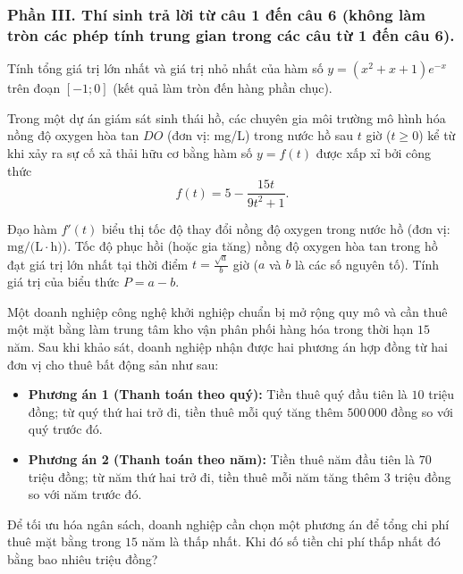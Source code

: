 \subsubsection*{Phần III. Thí sinh trả lời từ câu 1 đến câu 6 (không làm tròn các phép tính trung gian trong các câu từ 1 đến câu 6).}
\setcounter{bt}{0}
\begin{baitap}
	Tính tổng giá trị lớn nhất và giá trị nhỏ nhất của hàm số $y = (x^2 + x + 1)e^{-x}$ trên đoạn $[-1; 0]$ (kết quả làm tròn đến hàng phần chục).
\end{baitap}
\begin{baitap}
	Trong một dự án giám sát sinh thái hồ, các chuyên gia môi trường mô hình hóa nồng độ oxygen hòa tan $DO$ (đơn vị: \si{\milli\gram/\liter}) trong nước hồ sau $t$ giờ ($t \ge 0$) kể từ khi xảy ra sự cố xả thải hữu cơ bằng hàm số $y = f(t)$ được xấp xỉ bởi công thức $$f(t) = 5 - \frac{15t}{9t^2 + 1}.$$
	
	Đạo hàm $f'(t)$ biểu thị tốc độ thay đổi nồng độ oxygen trong nước hồ (đơn vị: $\si{\milli\gram/(\liter\cdot\hour)}$). Tốc độ phục hồi (hoặc gia tăng) nồng độ oxygen hòa tan trong hồ đạt giá trị lớn nhất tại thời điểm $t = \frac{\sqrt{a}}{b}$ giờ ($a$ và $b$ là các số nguyên tố). Tính giá trị của biểu thức $P = a - b$.
\end{baitap}

\begin{baitap}
	Một doanh nghiệp công nghệ khởi nghiệp chuẩn bị mở rộng quy mô và cần thuê một mặt bằng làm trung tâm kho vận phân phối hàng hóa trong thời hạn $15$ năm. Sau khi khảo sát, doanh nghiệp nhận được hai phương án hợp đồng từ hai đơn vị cho thuê bất động sản như sau:
	\begin{itemize}
		\item \textbf{Phương án 1 (Thanh toán theo quý):} Tiền thuê quý đầu tiên là $10$ triệu đồng; từ quý thứ hai trở đi, tiền thuê mỗi quý tăng thêm $500\,000$ đồng so với quý trước đó.
		\item \textbf{Phương án 2 (Thanh toán theo năm):} Tiền thuê năm đầu tiên là $70$ triệu đồng; từ năm thứ hai trở đi, tiền thuê mỗi năm tăng thêm $3$ triệu đồng so với năm trước đó.
	\end{itemize}
	Để tối ưu hóa ngân sách, doanh nghiệp cần chọn một phương án để tổng chi phí thuê mặt bằng trong $15$ năm là thấp nhất. Khi đó số tiền chi phí thấp nhất đó bằng bao nhiêu triệu đồng?
\end{baitap}

